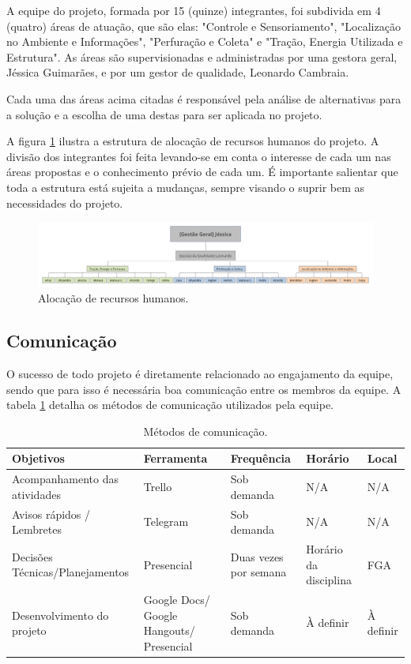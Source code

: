 A equipe do projeto, formada por 15 (quinze) integrantes, foi
subdivida em 4 (quatro) áreas de atuação, que são elas: "Controle
e Sensoriamento", "Localização no Ambiente e Informações", "Perfuração
e Coleta" e "Tração, Energia Utilizada e Estrutura". As áreas são
supervisionadas e administradas por uma gestora geral, Jéssica Guimarães,
e por um gestor de qualidade, Leonardo Cambraia.

Cada uma das áreas acima citadas é responsável pela análise de alternativas
para a solução e a escolha de uma destas para ser aplicada no projeto.

A figura \ref{fig:aloc} ilustra a estrutura de alocação de recursos humanos do
projeto. A divisão dos integrantes foi feita levando-se em conta o
interesse de cada um nas áreas propostas e o conhecimento prévio de
cada um. É importante salientar que toda a estrutura está sujeita a
mudanças, sempre visando o suprir bem as necessidades do projeto.

\begin{figure}[!htbp]
\begin{center}
\includegraphics[width=\textwidth]{figuras/alocacao.png}
\caption{\label{fig:aloc}Alocação de recursos humanos.}
\end{center}
\end{figure}

    \subsection{Comunicação}

O sucesso de todo projeto é diretamente relacionado ao engajamento
da equipe, sendo que para isso é necessária boa comunicação entre os
membros da equipe. A tabela \ref{tab:com} detalha os métodos de comunicação
utilizados pela equipe.

\begin{table}[!htbp]
\begin{center}
\begin{tabular}{|p{4cm}|p{4cm}|p{3cm}|p{3cm}|p{2cm}|}
\hline
\textbf{Objetivos} & \textbf{Ferramenta} & \textbf{Frequência} & \textbf{Horário} & \textbf{Local}\\\hline
Acompanhamento das atividades & Trello & Sob demanda & N/A & N/A\\\hline
Avisos rápidos / Lembretes & Telegram & Sob demanda & N/A & N/A\\\hline
Decisões Técnicas/Planejamentos & Presencial & Duas vezes por semana & Horário da disciplina & FGA\\\hline
Desenvolvimento do projeto & Google Docs/ Google Hangouts/ Presencial & Sob demanda & À definir & À definir\\\hline
\end{tabular}
\caption{\label{tab:com}Métodos de comunicação.}
\end{center}
\end{table}

